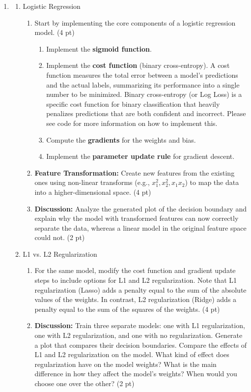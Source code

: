 \documentclass{article}
\theoremstyle{definition}
\theoremstyle{remark}
\newenvironment{Q}
        {%
          \clearpage
          \item
        }
        {%
          \phantom{s} %
          \bigskip
        }
\begin{document}
\begin{enumerate}[font={\Large\bfseries},left=0pt]
\begin{Q}
		\begin{enumerate}
			\item{Logistic Regression
			      \begin{enumerate}
				      \item Start by implementing the core components of a logistic regression model. (4 pt)
				            \begin{enumerate}
					            \item Implement the \textbf{sigmoid function}.
					            \item Implement the \textbf{cost function} (binary cross-entropy).  A cost function measures the total error between a model's predictions and the actual labels, summarizing its performance into a single number to be minimized. Binary cross-entropy (or Log Loss) is a specific cost function for binary classification that heavily penalizes predictions that are both confident and incorrect. Please see code for more information on how to implement this.
					            \item Compute the \textbf{gradients} for the weights and bias.
					            \item Implement the \textbf{parameter update rule} for gradient descent.
				            \end{enumerate}
				      \item \textbf{Feature Transformation:} Create new features from the existing ones using non-linear transforms (e.g., $x_1^2, x_2^2, x_1x_2$) to map the data into a higher-dimensional space. (4 pt)
				      \item \textbf{Discussion:} Analyze the generated plot of the decision boundary and explain why the model with transformed features can now correctly separate the data, whereas a linear model in the original feature space could not. (2 pt)
			      \end{enumerate}
			      }
			\item{L1 vs. L2 Regularization
			      \begin{enumerate}
				      \item For the same model, modify the cost function and gradient update steps to include options for L1 and L2 regularization. Note that L1 regularization (Lasso) adds a penalty equal to the sum of the absolute values of the weights. In contrast, L2 regularization (Ridge) adds a penalty equal to the sum of the squares of the weights. (4 pt)
				      \item \textbf{Discussion:} Train three separate models: one with L1 regularization, one with L2 regularization, and one with no regularization. Generate a plot that compares their decision boundaries. Compare the effects of L1 and L2 regularization on the model. What kind of effect does regularization have on the model weights? What is the main difference in how they affect the model's weights? When would you choose one over the other? (2 pt)

\end{enumerate}}
\end{enumerate}
\end{Q}
\end{enumerate}
\end{document}
